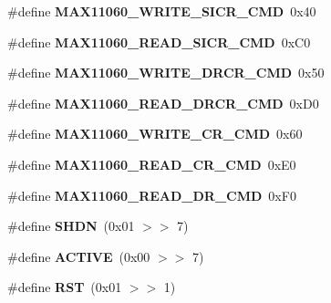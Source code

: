 \begin{DoxyCompactItemize}
\item 
\hypertarget{group__max11060_ga6bd1a3a3c4b0e25edcd1809449b16400}{}\#define {\bfseries M\+A\+X11060\+\_\+\+W\+R\+I\+T\+E\+\_\+\+S\+I\+C\+R\+\_\+\+C\+M\+D}~0x40\label{group__max11060_ga6bd1a3a3c4b0e25edcd1809449b16400}

\item 
\hypertarget{group__max11060_gaba9524692a46eb4ffbc2eb06ce1d046a}{}\#define {\bfseries M\+A\+X11060\+\_\+\+R\+E\+A\+D\+\_\+\+S\+I\+C\+R\+\_\+\+C\+M\+D}~0x\+C0\label{group__max11060_gaba9524692a46eb4ffbc2eb06ce1d046a}

\item 
\hypertarget{group__max11060_ga58070aaa444671c2a3f2cc754ecdb63c}{}\#define {\bfseries M\+A\+X11060\+\_\+\+W\+R\+I\+T\+E\+\_\+\+D\+R\+C\+R\+\_\+\+C\+M\+D}~0x50\label{group__max11060_ga58070aaa444671c2a3f2cc754ecdb63c}

\item 
\hypertarget{group__max11060_gace3a0e1b39275ab10c17e327ab46e92f}{}\#define {\bfseries M\+A\+X11060\+\_\+\+R\+E\+A\+D\+\_\+\+D\+R\+C\+R\+\_\+\+C\+M\+D}~0x\+D0\label{group__max11060_gace3a0e1b39275ab10c17e327ab46e92f}

\item 
\hypertarget{group__max11060_ga071e6433383b79c2c764148e8ee744b1}{}\#define {\bfseries M\+A\+X11060\+\_\+\+W\+R\+I\+T\+E\+\_\+\+C\+R\+\_\+\+C\+M\+D}~0x60\label{group__max11060_ga071e6433383b79c2c764148e8ee744b1}

\item 
\hypertarget{group__max11060_ga59586c5c5905a870f422f20597ec52f7}{}\#define {\bfseries M\+A\+X11060\+\_\+\+R\+E\+A\+D\+\_\+\+C\+R\+\_\+\+C\+M\+D}~0x\+E0\label{group__max11060_ga59586c5c5905a870f422f20597ec52f7}

\item 
\hypertarget{group__max11060_gaa82bd943f952486f9b8a3b226fb087b9}{}\#define {\bfseries M\+A\+X11060\+\_\+\+R\+E\+A\+D\+\_\+\+D\+R\+\_\+\+C\+M\+D}~0x\+F0\label{group__max11060_gaa82bd943f952486f9b8a3b226fb087b9}

\item 
\hypertarget{group__max11060_ga7f0b6cae5408d92d34123ee0e1a90ef5}{}\#define {\bfseries S\+H\+D\+N}~(0x01 $>$$>$ 7)\label{group__max11060_ga7f0b6cae5408d92d34123ee0e1a90ef5}

\item 
\hypertarget{group__max11060_ga3a6d3cd70078e6046471ec528a09cd19}{}\#define {\bfseries A\+C\+T\+I\+V\+E}~(0x00 $>$$>$ 7)\label{group__max11060_ga3a6d3cd70078e6046471ec528a09cd19}

\item 
\hypertarget{group__max11060_gac5d957e4fd3dc11cd97a54cf9ca057a4}{}\#define {\bfseries R\+S\+T}~(0x01 $>$$>$ 1)\label{group__max11060_gac5d957e4fd3dc11cd97a54cf9ca057a4}

\end{DoxyCompactItemize}
